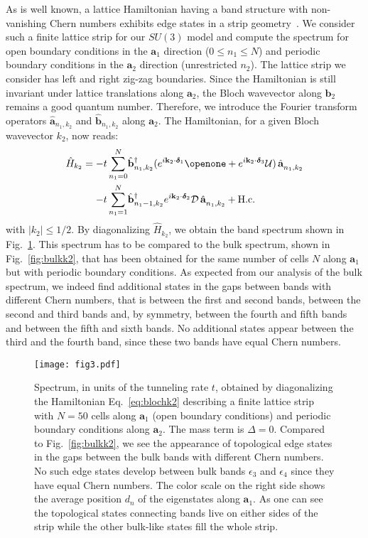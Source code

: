 \documentclass[aps,pra,showpacs,twocolumn,superscriptaddress]{revtex4-1}
\begin{document}
As is well known, a lattice Hamiltonian having a band structure with non-vanishing Chern numbers 
exhibits edge states in a strip geometry~\cite{Kane2010}.
We consider such a finite lattice strip for our $SU(3)$ model and 
compute the spectrum for open boundary conditions in the $\mathbf{a}_1$ direction ($0 \leq n_1 \leq N$) 
and periodic boundary conditions in the $\mathbf{a}_2$ direction (unrestricted $n_2$). 
The lattice strip we consider has left and right zig-zag boundaries. 
Since the Hamiltonian is still invariant under lattice translations along $\mathbf{a}_2$, 
the Bloch wavevector along $\mathbf{b}_2$ remains a good quantum number. 
Therefore, we introduce the Fourier transform operators $\hat{\mathbf{a}}_{n_1,k_2}$ and 
$\hat{\mathbf{b}}_{n_1,k_2}$ along $\mathbf{a}_2$.
The Hamiltonian, for a given Bloch wavevector $k_2$, now reads:
\begin{align}
\label{eq:blochk2}
\hat{H}_{k_2}=-t\sum_{n_1=0}^N& \hat{\mathbf{b}}^{\dagger}_{n_1,k_2}
	(e^{i\mathbf{k}_2\cdot\bm{\delta}_1}\openone
	+e^{i\mathbf{k}_2\cdot\bm{\delta}_3} \mathcal{U}) \, \hat{\mathbf{a}}^{\phantom{\dagger}}_{n_1,k_2}
	\nonumber\\
	-t\sum_{n_1=1}^N& \hat{\mathbf{b}}^{\dagger}_{n_1-1,k_2}e^{i\mathbf{k}_2\cdot\bm{\delta}_2}\mathcal{D}
	\, \hat{\mathbf{a}}^{\phantom{\dagger}}_{n_1,k_2}+\mathrm{H.c.}
\end{align}
with $|k_2| \leq 1/2$.
By diagonalizing $\hat{H}_{k_2}$, we obtain the band spectrum shown in Fig.~\ref{fig:specloczoom}. 
This spectrum has to be compared to the bulk spectrum, shown in Fig.~\ref{fig:bulkk2}, 
that has been obtained for the same number of cells $N$ along $\mathbf{a}_1$ but with periodic boundary conditions. As expected from our analysis of the bulk spectrum, we indeed find additional states in the gaps between bands with different 
Chern numbers, that is between the first and second bands, between the second and third bands and, by
symmetry, between the fourth and fifth bands and between the fifth and sixth bands. 
No additional states appear between the third and the fourth band, since these two bands have equal Chern numbers. 
\begin{figure}[t!p]
	\texttt{[image: fig3.pdf]}
	\caption{\label{fig:specloczoom} Spectrum, in units of the tunneling rate $t$, obtained by diagonalizing the 
	Hamiltonian Eq.~\eqref{eq:blochk2} describing a finite lattice strip with $N=50$ cells along $\mathbf{a}_1$ 
	(open boundary conditions) and periodic boundary conditions along $\mathbf{a}_2$. The mass term is $\Delta=0$.
	 Compared to Fig.~\ref{fig:bulkk2}, we see the appearance of topological 
	edge states in the gaps between the bulk bands with different Chern numbers. 
	No such edge states develop between bulk bands $\epsilon_3$ and $\epsilon_4$ 
	since they have equal Chern numbers. The color scale on the right side shows the average 
	position $d_n$ of the eigenstates along $\mathbf{a}_1$. As one can see the topological states connecting bands live 
	on either sides of the strip while the other bulk-like states fill the whole strip.
	}
	\end{figure}
\end{document}
